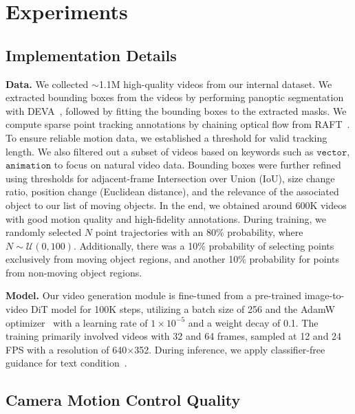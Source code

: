 \section{Experiments}
\label{sec-5-evaluation}

\subsection{Implementation Details}



\noindent\textbf{Data.} We collected $\sim$1.1M high-quality videos from our internal dataset. We extracted bounding boxes from the videos by performing panoptic segmentation with DEVA~\cite{cheng2023tracking}, followed by fitting the bounding boxes to the extracted masks. We compute sparse point tracking annotations by chaining optical flow from RAFT~\cite{teed2020raft}. To ensure reliable motion data, we established a threshold for valid tracking length. 
We also filtered out a subset of videos based on keywords such as $\texttt{vector}$, $\texttt{animation}$ to focus on natural video data. Bounding boxes were further refined using thresholds for adjacent-frame Intersection over Union (IoU), size change ratio, position change (Euclidean distance), and the relevance of the associated object to our list of moving objects. In the end, we obtained around 600K videos with good motion quality and high-fidelity annotations. During training, we randomly selected $N$ point trajectories with an 80\% probability, where $N \sim \mathcal{U}(0, 100)$. Additionally, there was a 10\% probability of selecting points exclusively from moving object regions, and another 10\% probability for points from non-moving object regions.

\noindent\textbf{Model.} Our video generation module is fine-tuned from a pre-trained image-to-video DiT model for 100K steps, utilizing a batch size of 256 and the AdamW optimizer~\cite{loshchilov2017decoupled} with a learning rate of $1 \times 10^{-5}$ and a weight decay of 0.1. The training primarily involved videos with 32 and 64 frames, sampled at 12 and 24 FPS with a resolution of 640$\times$352. During inference, we apply classifier-free guidance for text condition~\cite{ho2022classifier}.



\subsection{Camera Motion Control Quality}

